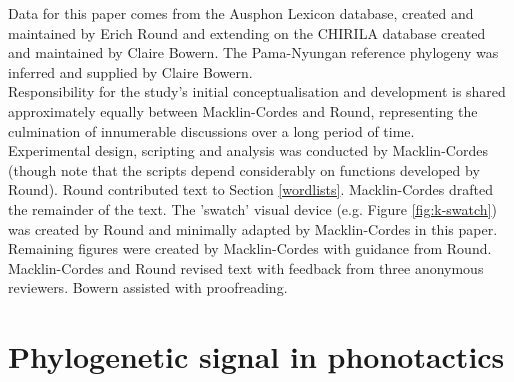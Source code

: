 \noindent
Data for this paper comes from the Ausphon Lexicon database, created and maintained by Erich Round and extending on the CHIRILA database created and maintained by Claire Bowern. The Pama-Nyungan reference phylogeny was inferred and supplied by Claire Bowern.\\

\noindent
Responsibility for the study's initial conceptualisation and development is shared approximately equally between Macklin-Cordes and Round, representing the culmination of innumerable discussions over a long period of time.\\

\noindent
Experimental design, scripting and analysis was conducted by Macklin-Cordes (though note that the scripts depend considerably on functions developed by Round). Round contributed text to Section \ref{wordlists}. Macklin-Cordes drafted the remainder of the text. The 'swatch' visual device (e.g. Figure \ref{fig:k-swatch}) was created by Round and minimally adapted by Macklin-Cordes in this paper. Remaining figures were created by Macklin-Cordes with guidance from Round. Macklin-Cordes and Round revised text with feedback from three anonymous reviewers. Bowern assisted with proofreading.

\chapter[Phylogenetic signal in phonotactics]{Phylogenetic signal in phonotactics}
\label{Chap:phylo-signal}	%
\pagestyle{headings}


